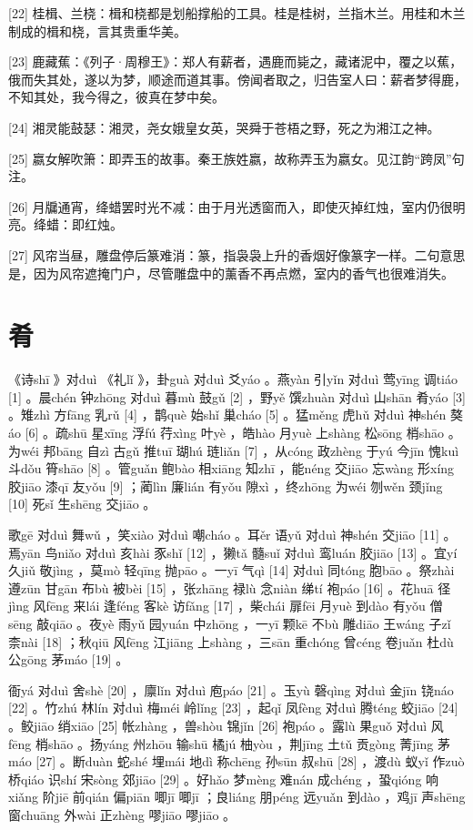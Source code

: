 \documentclass[12pt,UTF8]{ctexbook}
\begin{document}
[22] 桂楫、兰桡：楫和桡都是划船撑船的工具。桂是桂树，兰指木兰。用桂和木兰制成的楫和桡，言其贵重华美。

[23] 鹿藏蕉：《列子·周穆王》：郑人有薪者，遇鹿而毙之，藏诸泥中，覆之以蕉，俄而失其处，遂以为梦，顺途而道其事。傍闻者取之，归告室人曰：薪者梦得鹿，不知其处，我今得之，彼真在梦中矣。

[24] 湘灵能鼓瑟：湘灵，尧女娥皇女英，哭舜于苍梧之野，死之为湘江之神。

[25] 嬴女解吹箫：即弄玉的故事。秦王族姓嬴，故称弄玉为嬴女。见江韵“跨凤”句注。

[26] 月牖通宵，绛蜡罢时光不减：由于月光透窗而入，即使灭掉红烛，室内仍很明亮。绛蜡：即红烛。

[27] 风帘当昼，雕盘停后篆难消：篆，指袅袅上升的香烟好像篆字一样。二句意思是，因为风帘遮掩门户，尽管雕盘中的薰香不再点燃，室内的香气也很难消失。





\chapter{肴}


《诗shī 》对duì 《礼lǐ 》，卦guà 对duì 爻yáo 。燕yàn 引yǐn 对duì 莺yīng 调tiáo [1] 。晨chén 钟zhōng 对duì 暮mù 鼓gǔ [2] ，野yě 馔zhuàn 对duì 山shān 肴yáo [3] 。雉zhì 方fāng 乳rǔ [4] ，鹊què 始shǐ 巢cháo [5] 。猛měng 虎hǔ 对duì 神shén 獒áo [6] 。疏shū 星xīng 浮fú 荇xìng 叶yè ，皓hào 月yuè 上shàng 松sōng 梢shāo 。为wéi 邦bāng 自zì 古gǔ 推tuī 瑚hú 琏liǎn [7] ，从cóng 政zhèng 于yú 今jīn 愧kuì 斗dǒu 筲shāo [8] 。管guǎn 鲍bào 相xiāng 知zhī ，能néng 交jiāo 忘wàng 形xíng 胶jiāo 漆qī 友yǒu [9] ；蔺lìn 廉lián 有yǒu 隙xì ，终zhōng 为wéi 刎wěn 颈jǐng [10] 死sǐ 生shēng 交jiāo 。

歌gē 对duì 舞wǔ ，笑xiào 对duì 嘲cháo 。耳ěr 语yǔ 对duì 神shén 交jiāo [11] 。焉yān 鸟niǎo 对duì 亥hài 豕shǐ [12] ，獭tǎ 髓suǐ 对duì 鸾luán 胶jiāo [13] 。宜yí 久jiǔ 敬jìng ，莫mò 轻qīng 抛pāo 。一yī 气qì [14] 对duì 同tóng 胞bāo 。祭zhài 遵zūn 甘gān 布bù 被bèi [15] ，张zhāng 禄lù 念niàn 绨tí 袍páo [16] 。花huā 径jìng 风fēng 来lái 逢féng 客kè 访fǎng [17] ，柴chái 扉fēi 月yuè 到dào 有yǒu 僧sēng 敲qiāo 。夜yè 雨yǔ 园yuán 中zhōng ，一yī 颗kē 不bù 雕diāo 王wáng 子zǐ 柰nài [18] ；秋qiū 风fēng 江jiāng 上shàng ，三sān 重chóng 曾céng 卷juǎn 杜dù 公gōng 茅máo [19] 。

衙yá 对duì 舍shè [20] ，廪lǐn 对duì 庖páo [21] 。玉yù 磬qìng 对duì 金jīn 铙náo [22] 。竹zhú 林lín 对duì 梅méi 岭lǐng [23] ，起qǐ 凤fèng 对duì 腾téng 蛟jiāo [24] 。鲛jiāo 绡xiāo [25] 帐zhàng ，兽shòu 锦jǐn [26] 袍páo 。露lù 果guǒ 对duì 风fēng 梢shāo 。扬yáng 州zhōu 输shū 橘jú 柚yòu ，荆jīng 土tǔ 贡gòng 菁jīng 茅máo [27] 。断duàn 蛇shé 埋mái 地dì 称chēng 孙sūn 叔shū [28] ，渡dù 蚁yǐ 作zuò 桥qiáo 识shí 宋sòng 郊jiāo [29] 。好hǎo 梦mèng 难nán 成chéng ，蛩qióng 响xiǎng 阶jiē 前qián 偏piān 唧jī 唧jī ；良liáng 朋péng 远yuǎn 到dào ，鸡jī 声shēng 窗chuāng 外wài 正zhèng 嘐jiāo 嘐jiāo 。
\end{document}
